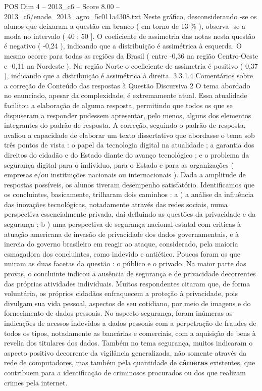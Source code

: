 \begin{textsample}{POS Dim 4 – 2013\_c6 – Score 8.00 – 2013\_c6/enade\_2013\_agro\_5c011a4308.txt}
Neste gráfico, desconsiderando -se os alunos que deixaram a questão em branco ( em torno de 13 \% ), observa -se a moda no intervalo ( 40 ; 50 ].
O coeficiente de assimetria das notas nesta questão é negativo ( -0,24 ), indicando que a distribuição é assimétrica à esquerda.
O mesmo ocorre para todas as regiões da Brasil ( entre -0,36 na região Centro-Oeste e -0,11 na Nordeste ).
Na região Norte o coeficiente de assimetria é positivo ( 0,37 ), indicando que a distribuição é assimétrica à direita. 3.3.1.4 Comentários sobre a correção de Conteúdo das respostas à Questão Discursiva 2 O tema abordado no enunciado, apesar da complexidade, é extremamente atual.
Essa atualidade facilitou a elaboração de alguma resposta, permitindo que todos os que se dispuseram a responder pudessem apresentar, pelo menos, alguns dos elementos integrantes do padrão de resposta.
A correção, seguindo o padrão de resposta, avaliou a capacidade de elaborar um texto dissertativo que abordasse o tema sob três pontos de vista : o papel da tecnologia digital na atualidade ; a garantia dos direitos do cidadão e do Estado diante do avanço tecnológico ; e o problema da segurança digital para o indivíduo, para o Estado e para as organizações ( empresas e/ou instituições nacionais ou internacionais ).
Dada a amplitude de respostas possíveis, os alunos tiveram desempenho satisfatório.
Identificamos que os concluintes, basicamente, trilharam dois caminhos : a ) a análise da influência das inovações tecnológicas, notadamente através das redes sociais, numa perspectiva essencialmente privada, daí defluindo as questões da privacidade e da segurança ; b ) uma perspectiva de segurança nacional-estatal com criticas à atuação americana de invasão de privacidade dos dados governamentais, e à inercia do governo brasileiro em reagir ao ataque, considerado, pela maioria esmagadora dos concluintes, como indevido e antiético.
Poucos foram os que uniram as duas facetas da questão : o público e o privado.
Na maior parte das provas, o concluinte indicou a ausência de segurança e de privacidade decorrentes das próprias atividades individuais.
Muitos respondentes citaram que, de forma voluntária, os próprios cidadãos enfraquecem a proteção à privacidade, pois divulgam sua vida pessoal, aspectos de seu cotidiano, por meio de imagens e do fornecimento de dados pessoais.
No aspecto segurança, foram inúmeras as indicações de acessos indevidos a dados pessoais com a perpetração de fraudes de todos os tipos, notadamente as bancárias e comerciais, com a aquisição de bens à revelia dos titulares dos dados.
Também no tema segurança, muitos indicaram o aspecto positivo decorrente da vigilância generalizada, não somente através da rede de computadores, mas também pela quantidade de \textbf{câmeras} existentes, que contribuem para a identificação de criminosos procurados ou dos que realizam crimes pela internet.

\end{textsample}
